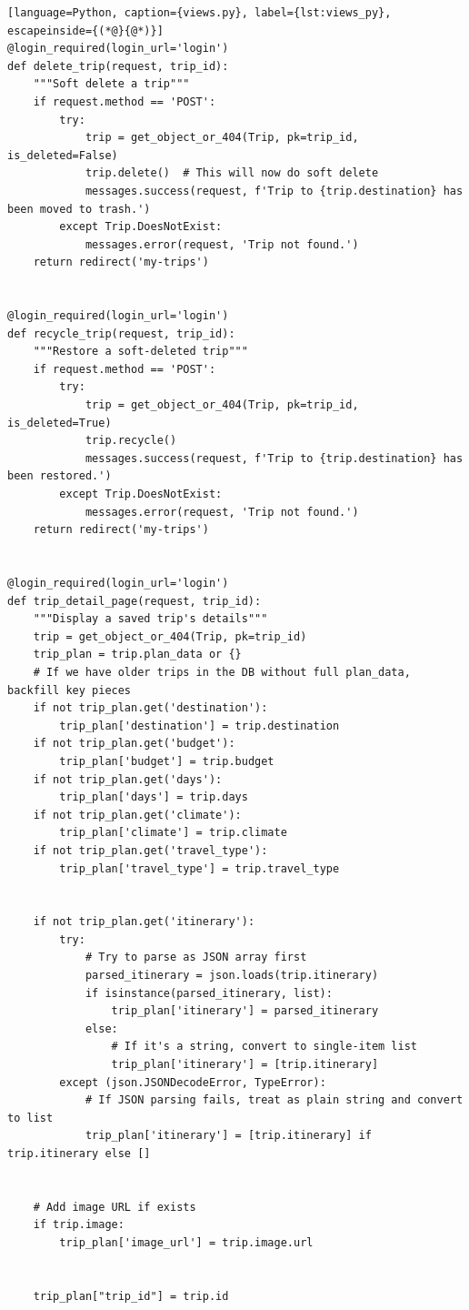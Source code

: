 \begin{lstlisting}[language=Python, caption={views.py}, label={lst:views_py}, escapeinside={(*@}{@*)}]
@login_required(login_url='login')
def delete_trip(request, trip_id):
    """Soft delete a trip"""
    if request.method == 'POST':
        try:
            trip = get_object_or_404(Trip, pk=trip_id, is_deleted=False)
            trip.delete()  # This will now do soft delete
            messages.success(request, f'Trip to {trip.destination} has been moved to trash.')
        except Trip.DoesNotExist:
            messages.error(request, 'Trip not found.')
    return redirect('my-trips')


@login_required(login_url='login')
def recycle_trip(request, trip_id):
    """Restore a soft-deleted trip"""
    if request.method == 'POST':
        try:
            trip = get_object_or_404(Trip, pk=trip_id, is_deleted=True)
            trip.recycle()
            messages.success(request, f'Trip to {trip.destination} has been restored.')
        except Trip.DoesNotExist:
            messages.error(request, 'Trip not found.')
    return redirect('my-trips')


@login_required(login_url='login')
def trip_detail_page(request, trip_id):
    """Display a saved trip's details"""
    trip = get_object_or_404(Trip, pk=trip_id)
    trip_plan = trip.plan_data or {}
    # If we have older trips in the DB without full plan_data, backfill key pieces
    if not trip_plan.get('destination'):
        trip_plan['destination'] = trip.destination
    if not trip_plan.get('budget'):
        trip_plan['budget'] = trip.budget
    if not trip_plan.get('days'):
        trip_plan['days'] = trip.days
    if not trip_plan.get('climate'):
        trip_plan['climate'] = trip.climate
    if not trip_plan.get('travel_type'):
        trip_plan['travel_type'] = trip.travel_type


    if not trip_plan.get('itinerary'):
        try:
            # Try to parse as JSON array first
            parsed_itinerary = json.loads(trip.itinerary)
            if isinstance(parsed_itinerary, list):
                trip_plan['itinerary'] = parsed_itinerary
            else:
                # If it's a string, convert to single-item list
                trip_plan['itinerary'] = [trip.itinerary]
        except (json.JSONDecodeError, TypeError):
            # If JSON parsing fails, treat as plain string and convert to list
            trip_plan['itinerary'] = [trip.itinerary] if trip.itinerary else []


    # Add image URL if exists
    if trip.image:
        trip_plan['image_url'] = trip.image.url


    trip_plan["trip_id"] = trip.id



\end{lstlisting}
